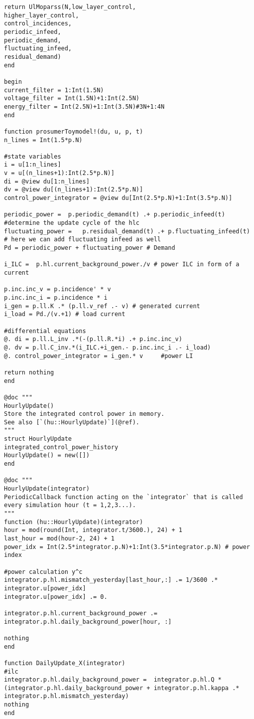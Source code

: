 \begin{lstlisting}
return UlMoparss(N,low_layer_control,
higher_layer_control,
control_incidences,
periodic_infeed,
periodic_demand,
fluctuating_infeed,
residual_demand)
end

begin
current_filter = 1:Int(1.5N)
voltage_filter = Int(1.5N)+1:Int(2.5N)
energy_filter = Int(2.5N)+1:Int(3.5N)#3N+1:4N
end

function prosumerToymodel!(du, u, p, t)
n_lines = Int(1.5*p.N)

#state variables
i = u[1:n_lines]
v = u[(n_lines+1):Int(2.5*p.N)]
di = @view du[1:n_lines]
dv = @view du[(n_lines+1):Int(2.5*p.N)]
control_power_integrator = @view du[Int(2.5*p.N)+1:Int(3.5*p.N)]

periodic_power =  p.periodic_demand(t) .+ p.periodic_infeed(t) #determine the update cycle of the hlc
fluctuating_power =   p.residual_demand(t) .+ p.fluctuating_infeed(t) # here we can add fluctuating infeed as well
Pd = periodic_power + fluctuating_power # Demand

i_ILC =  p.hl.current_background_power./v # power ILC in form of a current

p.inc.inc_v = p.incidence' * v
p.inc.inc_i = p.incidence * i
i_gen = p.ll.K .* (p.ll.v_ref .- v) # generated current
i_load = Pd./(v.+1) # load current

#differential equations
@. di = p.ll.L_inv .*(-(p.ll.R.*i) .+ p.inc.inc_v)
@. dv = p.ll.C_inv.*(i_ILC.+i_gen.- p.inc.inc_i .- i_load)
@. control_power_integrator = i_gen.* v 	#power LI

return nothing
end

@doc """
HourlyUpdate()
Store the integrated control power in memory.
See also [`(hu::HourlyUpdate)`](@ref).
"""
struct HourlyUpdate
integrated_control_power_history
HourlyUpdate() = new([])
end

@doc """
HourlyUpdate(integrator)
PeriodicCallback function acting on the `integrator` that is called every simulation hour (t = 1,2,3...).
"""
function (hu::HourlyUpdate)(integrator)
hour = mod(round(Int, integrator.t/3600.), 24) + 1
last_hour = mod(hour-2, 24) + 1
power_idx = Int(2.5*integrator.p.N)+1:Int(3.5*integrator.p.N) # power index

#power calculation y^c
integrator.p.hl.mismatch_yesterday[last_hour,:] .= 1/3600 .* integrator.u[power_idx]
integrator.u[power_idx] .= 0.

integrator.p.hl.current_background_power .= integrator.p.hl.daily_background_power[hour, :]

nothing
end

function DailyUpdate_X(integrator)
#ilc
integrator.p.hl.daily_background_power =  integrator.p.hl.Q * (integrator.p.hl.daily_background_power + integrator.p.hl.kappa .* integrator.p.hl.mismatch_yesterday)
nothing
end


\end{lstlisting}
